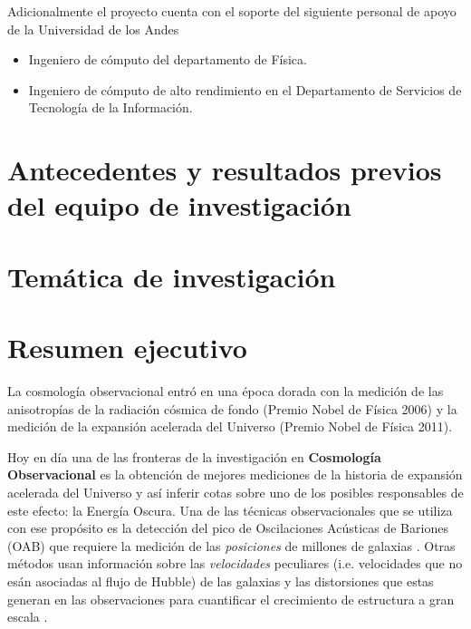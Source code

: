 \documentclass[12pt]{article}
\begin{document}
\noindent
Adicionalmente el proyecto cuenta con el soporte del siguiente
personal de apoyo de la Universidad de los Andes 

\begin{itemize}
\item{Ingeniero de c\'omputo del departamento de F\'isica.}
\item{Ingeniero de c\'omputo de alto rendimiento en el Departamento de Servicios de Tecnolog\'ia de la Informaci\'on}.
\end{itemize}

\section{Antecedentes y resultados previos del equipo de
  investigaci\'on} 

\section{Tem\'atica de investigaci\'on}



\section{Resumen ejecutivo}

La cosmología observacional entró en una época dorada con la medición
de las anisotropías de la radiación cósmica de fondo (Premio Nobel de
Física 2006) y la medición de la expansión acelerada del Universo
(Premio Nobel de Física 2011). 

Hoy en d\'ia una de las fronteras de la investigación en {\bf Cosmología
Observacional} es la obtenci\'on de mejores mediciones de la historia de
expansión acelerada del Universo y as\'i inferir cotas sobre uno de
los posibles responsables de este efecto: la Energ\'ia Oscura.  Una de
las t\'ecnicas observacionales que se utiliza con ese prop\'osito es
la detecci\'on del pico de Oscilaciones Ac\'usticas de
Bariones (OAB) que requiere la medici\'on de las \emph{posiciones} de
millones de galaxias \cite{Eisenstein2005}. Otras m\'etodos usan
informaci\'on sobre las \emph{velocidades} peculiares (i.e. velocidades
que no es\'an asociadas al flujo de Hubble) de las galaxias y las distorsiones
que estas generan en las observaciones para cuantificar el crecimiento
de estructura a gran escala \cite{Scoccimarro2004}.
\end{document}
